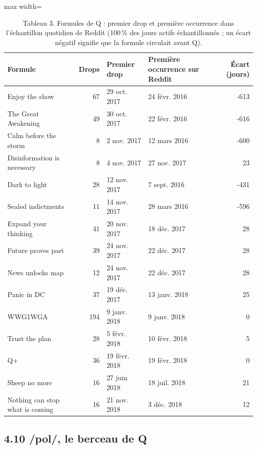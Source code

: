 \documentclass[11pt,a4paper]{article}
\begin{document}
\begin{table}[htbp]
\centering\small
\caption*{Tableau 3. Formules de Q : premier drop et première occurrence dans l'échantillon quotidien de Reddit (100 \% des jours actifs échantillonnés ; un écart négatif signifie que la formule circulait avant Q).}
\begin{adjustbox}{max width=\linewidth}
\begin{tabular}{lrllr}
\toprule
\textbf{Formule} & \textbf{Drops} & \textbf{Premier drop} & \textbf{Première occurrence sur Reddit} & \textbf{Écart (jours)} \\
\midrule
Enjoy the show & 67 & 29 oct. 2017 & 24 févr. 2016 & -613 \\
The Great Awakening & 49 & 30 oct. 2017 & 22 févr. 2016 & -616 \\
Calm before the storm & 8 & 2 nov. 2017 & 12 mars 2016 & -600 \\
Disinformation is necessary & 8 & 4 nov. 2017 & 27 nov. 2017 & 23 \\
Dark to light & 28 & 12 nov. 2017 & 7 sept. 2016 & -431 \\
Sealed indictments & 11 & 14 nov. 2017 & 28 mars 2016 & -596 \\
Expand your thinking & 41 & 20 nov. 2017 & 18 déc. 2017 & 28 \\
Future proves past & 39 & 24 nov. 2017 & 22 déc. 2017 & 28 \\
News unlocks map & 12 & 24 nov. 2017 & 22 déc. 2017 & 28 \\
Panic in DC & 37 & 19 déc. 2017 & 13 janv. 2018 & 25 \\
WWG1WGA & 194 & 9 janv. 2018 & 9 janv. 2018 & 0 \\
Trust the plan & 28 & 5 févr. 2018 & 10 févr. 2018 & 5 \\
Q+ & 36 & 19 févr. 2018 & 19 févr. 2018 & 0 \\
Sheep no more & 16 & 27 juin 2018 & 18 juil. 2018 & 21 \\
Nothing can stop what is coming & 16 & 21 nov. 2018 & 3 déc. 2018 & 12 \\
\bottomrule
\end{tabular}
\end{adjustbox}
\end{table}

\subsection*{4.10 /pol/, le berceau de Q}
\end{document}
